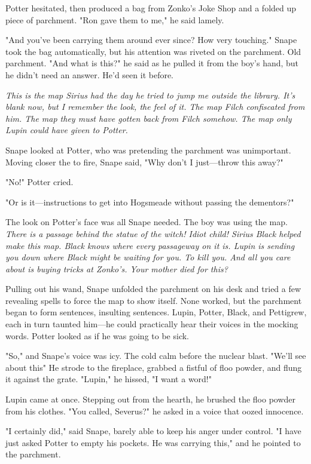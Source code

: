 Potter hesitated, then produced a bag from Zonko's Joke Shop and a folded up piece of parchment. "Ron gave them to me," he said lamely.

"And you've been carrying them around ever since? How very touching." Snape took the bag automatically, but his attention was riveted on the parchment. Old parchment. "And what is this?" he said as he pulled it from the boy's hand, but he didn't need an answer. He'd seen it before.

\emph{This is the map Sirius had the day he tried to jump me outside the library. It's blank now, but I remember the look, the feel of it. The map Filch confiscated from him. The map they must have gotten back from Filch somehow. The map only Lupin could have given to Potter.}

Snape looked at Potter, who was pretending the parchment was unimportant. Moving closer the to fire, Snape said, "Why don't I just—throw this away?"

"No!" Potter cried.

"Or is it—instructions to get into Hogsmeade without passing the dementors?"

The look on Potter's face was all Snape needed. The boy was using the map. \emph{There is a passage behind the statue of the witch! Idiot child! Sirius Black helped make this map. Black knows where every passageway on it is. Lupin is sending you down where Black might be waiting for you. To kill you. And all you care about is buying tricks at Zonko's. Your mother died for this?}

Pulling out his wand, Snape unfolded the parchment on his desk and tried a few revealing spells to force the map to show itself. None worked, but the parchment began to form sentences, insulting sentences. Lupin, Potter, Black, and Pettigrew, each in turn taunted him—he could practically hear their voices in the mocking words. Potter looked as if he was going to be sick.

"So," and Snape's voice was icy. The cold calm before the nuclear blast. "We'll see about this{\el}" He strode to the fireplace, grabbed a fistful of floo powder, and flung it against the grate. "Lupin," he hissed, "I want a word!"

Lupin came at once. Stepping out from the hearth, he brushed the floo powder from his clothes. "You called, Severus?" he asked in a voice that oozed innocence.

"I certainly did," said Snape, barely able to keep his anger under control. "I have just asked Potter to empty his pockets. He was carrying this," and he pointed to the parchment.

